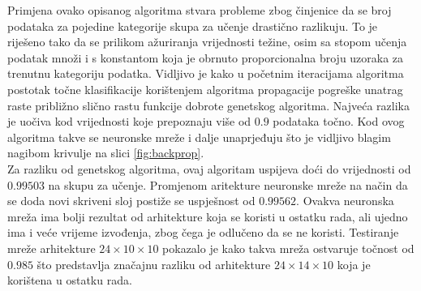 \documentclass[times, utf8, zavrsni, numeric]{fer}
\begin{document}
Primjena ovako opisanog algoritma stvara probleme zbog činjenice da se broj podataka za pojedine kategorije skupa za učenje drastično razlikuju.
To je riješeno tako da se prilikom ažuriranja vrijednosti težine, osim sa stopom učenja podatak množi i s konstantom koja je obrnuto proporcionalna broju uzoraka za trenutnu kategoriju podatka.
Vidljivo je kako u početnim iteracijama algoritma postotak točne klasifikacije korištenjem algoritma propagacije pogreške unatrag raste približno slično rastu funkcije dobrote genetskog algoritma.
Najveća razlika je uočiva kod vrijednosti koje prepoznaju više od $0.9$ podataka točno.
Kod ovog algoritma takve se neuronske mreže i dalje unaprjeđuju što je vidljivo blagim nagibom krivulje na slici \ref{fig:backprop}.\\

Za razliku od genetskog algoritma, ovaj algoritam uspijeva doći do vrijednosti od $0.99503$ na skupu za učenje.
Promjenom aritekture neuronske mreže na način da se doda novi skriveni sloj postiže se uspješnost od $0.99562$.
Ovakva neuronska mreža ima bolji rezultat od arhitekture koja se koristi u ostatku rada, ali ujedno ima i veće vrijeme izvođenja, zbog čega je odlučeno da se ne koristi.
Testiranje mreže arhitekture $24\times10\times10$ pokazalo je kako takva mreža ostvaruje točnost od $0.985$ što predstavlja značajnu razliku od arhitekture $24\times14\times10$ koja je korištena u ostatku rada.
\end{document}
